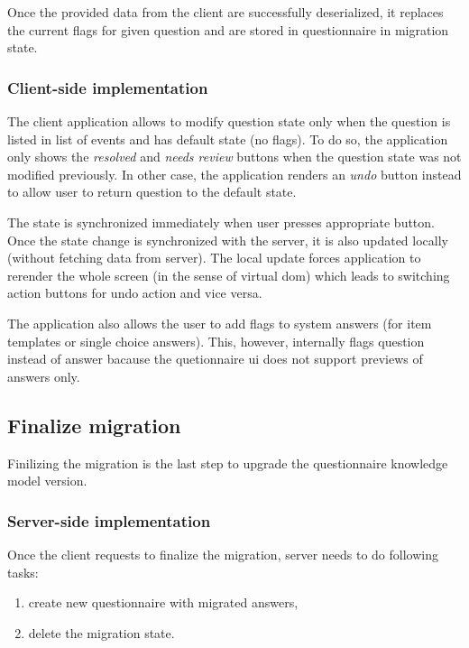 Once the provided data from the client are successfully deserialized, it replaces the current flags for given question and are stored in questionnaire in migration state.

\subsubsection*{Client-side implementation}

The client application allows to modify question state only when the question is listed in list of events and has default state (no flags).
To do so, the application only shows the \textit{resolved} and \textit{needs review} buttons when the question state was not modified previously.
In other case, the application renders an \textit{undo} button instead to allow user to return question to the default state.

The state is synchronized immediately when user presses appropriate button.
Once the state change is synchronized with the server, it is also updated locally (without fetching data from server).
The local update forces application to rerender the whole screen (in the sense of virtual \gls{dom}) which leads to switching action buttons for undo action and vice versa.

The application also allows the user to add flags to system answers (for item templates or single choice answers).
This, however, internally flags question instead of answer bacause the quetionnaire \gls{ui} does not support previews of answers only.

\subsection{Finalize migration}

Finilizing the migration is the last step to upgrade the questionnaire knowledge model version.

\subsubsection*{Server-side implementation}

Once the client requests to finalize the migration, server needs to do following tasks:

\begin{enumerate}
    \item create new questionnaire with migrated answers,
    \item delete the migration state.
\end{enumerate}

